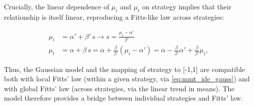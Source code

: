 \documentclass[acmlarge, manuscript,review]{acmart}
\newcommand{\mmt}{\ensuremath{\overline{\mt}}\xspace}
\newcommand{\mt}{\ensuremath{{\text{MT}}}\xspace}
\newcommand{\ide}{\ensuremath{{\text{ID}_e}}\xspace}
\begin{document}
Crucially, the linear dependence of $\mu_i$ and $\mu_t$ on strategy implies that their relationship is itself linear, reproducing a Fitts-like law across strategies:


\begin{align}
	\mu_i & = \alpha' + \beta'\,s  \longrightarrow s =  \frac{\mu_i - \alpha'}{\beta'} \\
	\mu_t & = \alpha + \beta\,s = \alpha + \frac{\beta}{\beta'} (\mu_i - \alpha')  = \alpha - \frac{\beta}{\beta'}\alpha' + \frac{\beta}{\beta'}\mu_i,
\end{align}

Thus, the Gaussian model and the mapping of strategy to [-1,1] are compatible both with local Fitts' law (within a given strategy, via \autoref{eq:mmt_ide_gauss}) and with global Fitts' law (across strategies, via the linear trend in means). The model therefore provides a bridge between individual strategies and Fitts' law.



\end{document}

